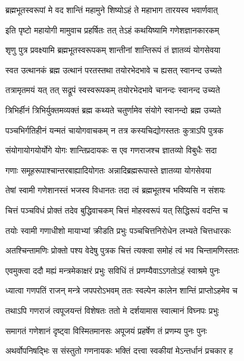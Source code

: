 \twolineshloka
{ब्रह्मभूतस्वरूपां मे वद शान्तिं महामुने}
{शिष्योऽहं ते महाभाग तारयस्व भवार्णवात्} %

\twolineshloka
{इति पृष्टो महायोगी मामुवाच प्रहर्षितः}
{तत् तेऽहं कथयिष्यामि गणेशज्ञानकारकम्} %


\twolineshloka
{श‍ृणु पुत्र प्रवक्ष्यामि ब्रह्मभूतस्वरूपकम्}
{शान्तीनां शान्तिरूपं तं ज्ञातव्यं योगसेवया} %

\twolineshloka
{स्वत उत्थानकं ब्रह्म उत्थानं परतस्तथा}
{तयोरभेदभावे च ह्यसत् स्वानन्द उच्यते} %

\twolineshloka
{तत्रामृतमयं यत् तत् सद्रूपं स्वस्वरूपकम्}
{तयोरभेदभावे चानन्दः स्वानन्द उच्यते} %

\twolineshloka
{त्रिभिर्हीनं त्रिभिर्युक्तमव्यक्तं ब्रह्म कथ्यते}
{चतुर्णामेव संयोगे स्वानन्दो ब्रह्म उच्यते} %

\twolineshloka
{पञ्चभिर्गतिहीनं यन्मतं चायोगवाचकम्}
{न तत्र कस्यचिद्योगस्ततः कुत्राऽपि पुत्रक} %

\twolineshloka
{संयोगायोगयोर्योगे योगः शान्तिप्रदायकः}
{स एव गणराजश्च ज्ञातव्यो विबुधैः सदा} %

\twolineshloka
{गणाः समूहरूपाश्चान्तरबाह्यादियोगतः}
{अन्नादिब्रह्मरूपास्ते ज्ञातव्या योगसेवया} %

\twolineshloka
{तेषां स्वामी गणेशानस्तं भजस्व विधानतः}
{तदा त्वं ब्रह्मभूतश्च भविष्यसि न संशयः} %

\twolineshloka
{चित्तं पञ्चविधं प्रोक्तं तदेव बुद्धिवाचकम्}
{चित्तं मोहस्वरूपं यत् सिद्धिरूपं वदन्ति च} %

\twolineshloka
{तयोः स्वामी गणाधीशो मायाभ्यां क्रीडति प्रभुः}
{पञ्चचित्तनिरोधेन लभ्यते चित्तधारकः} %

\twolineshloka
{अतश्चिन्तामणिः प्रोक्तो पश्य वेदेषु पुत्रक}
{चित्तं त्यक्त्वा समोहं त्वं भव चिन्तामणिस्ततः} %

\twolineshloka
{एवमुक्त्वा ददौ मह्यं मन्त्रमेकाक्षरं प्रभुः}
{सविधिं तं प्रणम्यैवाऽऽगतोऽहं स्वाश्रमे पुनः} %

\twolineshloka
{ध्यात्वा गणपतिं राजन् मन्त्रे जपपरोऽभवम्}
{ततः स्वल्पेन कालेन शान्तिं प्राप्तोऽहमेव च} %

\twolineshloka
{तथाऽपि गणराजं त्वपूजयन्तं विशेषतः}
{ततो मे दर्शयामास स्वात्मानं विघ्नपः प्रभुः} %

\twolineshloka
{समागतं गणेशानं दृष्ट्वा विस्मितमानसः}
{अपूजयं प्रहर्षेण तं प्रणम्य पुनः पुनः} %

\twolineshloka
{अथर्वोपनिषद्भिः स संस्तुतो गणनायकः}
{भक्तिं दत्त्वा स्वकीयां मेऽन्तर्धानं प्रचकार ह} %

